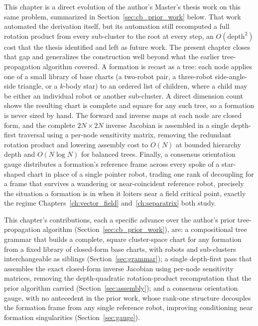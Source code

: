 \documentclass[12pt, letterpaper, oneside]{report}
\begin{document}
This chapter is a direct evolution of the author's Master's thesis work on
this same problem, summarized in Section~\ref{sec:cb_prior_work} below. That
work automated the derivation itself, but its automation still recomputed a
full rotation product from every sub-cluster to the root at every step, an
$O(\text{depth}^2)$ cost that the thesis identified and left as future work.
The present chapter closes that gap and generalizes the construction well
beyond what the earlier tree-propagation algorithm covered. A formation is
recast as a tree: each node applies one of a small
library of base charts (a two-robot pair, a three-robot side-angle-side
triangle, or a $k$-body star) to an ordered list of children, where a child
may be either an individual robot or another sub-cluster. A direct dimension
count shows the resulting chart is complete and square for any such tree, so
a formation is never sized by hand. The forward and inverse maps at each
node are closed form, and the complete $2N \times 2N$ inverse Jacobian is
assembled in a single depth-first traversal using a per-node sensitivity
matrix, removing the redundant rotation product and lowering assembly cost
to $O(N)$ at bounded hierarchy depth and $O(N \log N)$ for balanced trees.
Finally, a consensus orientation gauge distributes a formation's reference
frame across every spoke of a star-shaped chart in place of a single pointer
robot, trading one rank of decoupling for a frame that survives a wandering
or near-coincident reference robot, precisely the situation a formation is
in when it loiters near a field critical point, exactly the regime
Chapters~\ref{ch:vector_field} and~\ref{ch:separatrix} both study.

This chapter's contributions, each a specific advance over the author's
prior tree-propagation algorithm (Section~\ref{sec:cb_prior_work}), are: a
compositional tree grammar that builds a complete, square cluster-space
chart for any formation from a fixed library of closed-form base charts,
with robots and sub-clusters interchangeable as siblings
(Section~\ref{sec:grammar}); a single depth-first pass that assembles the
exact closed-form inverse Jacobian using per-node sensitivity matrices,
removing the depth-quadratic rotation-product recomputation that the prior
algorithm carried (Section~\ref{sec:assembly}); and a consensus orientation
gauge, with no antecedent in the prior work, whose rank-one structure
decouples the formation frame from any single reference robot, improving
conditioning near formation singularities (Section~\ref{sec:gauge}).
\end{document}
